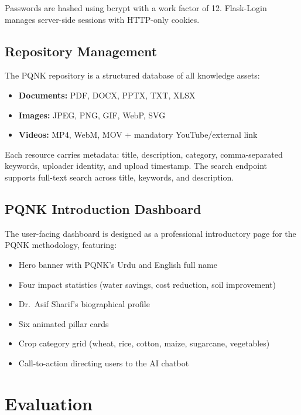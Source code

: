 \documentclass[12pt, a4paper]{article}
\begin{document}
\begin{onehalfspacing}
Passwords are hashed using bcrypt with a work factor of 12. Flask-Login manages
server-side sessions with HTTP-only cookies.

\subsection{Repository Management}

The PQNK repository is a structured database of all knowledge assets:
\begin{itemize}[noitemsep]
  \item \textbf{Documents:} PDF, DOCX, PPTX, TXT, XLSX
  \item \textbf{Images:} JPEG, PNG, GIF, WebP, SVG
  \item \textbf{Videos:} MP4, WebM, MOV + mandatory YouTube/external link
\end{itemize}

Each resource carries metadata: title, description, category, comma-separated
keywords, uploader identity, and upload timestamp. The search endpoint supports
full-text search across title, keywords, and description.

\subsection{PQNK Introduction Dashboard}

The user-facing dashboard is designed as a professional introductory page for
the PQNK methodology, featuring:
\begin{itemize}[noitemsep]
  \item Hero banner with PQNK's Urdu and English full name
  \item Four impact statistics (water savings, cost reduction, soil improvement)
  \item Dr.~Asif Sharif's biographical profile
  \item Six animated pillar cards
  \item Crop category grid (wheat, rice, cotton, maize, sugarcane, vegetables)
  \item Call-to-action directing users to the AI chatbot
\end{itemize}


\section{Evaluation}


\end{onehalfspacing}
\end{document}
